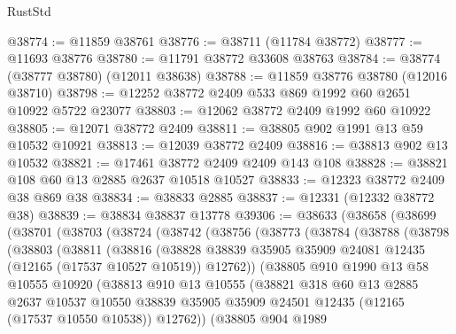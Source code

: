\begin{lexlean}{RustStd}
\begin{coremodule}
@38774 := @11859 @38761
@38776 := @38711 (@11784 @38772)
@38777 := @11693 @38776
@38780 := @11791 @38772 @33608 @38763
@38784 := @38774 (@38777 @38780) (@12011 @38638)
@38788 := @11859 @38776 @38780 (@12016 @38710)
@38798 := @12252 @38772 @2409 @533 @869 @1992 @60 @2651 @10922 @5722 @23077
@38803 := @12062 @38772 @2409 @1992 @60 @10922
@38805 := @12071 @38772 @2409
@38811 := @38805 @902 @1991 @13 @59 @10532 @10921
@38813 := @12039 @38772 @2409
@38816 := @38813 @902 @13 @10532
@38821 := @17461 @38772 @2409 @2409 @143 @108
@38828 := @38821 @108 @60 @13 @2885 @2637 @10518 @10527
@38833 := @12323 @38772 @2409 @38 @869 @38
@38834 := @38833 @2885
@38837 := @12331 (@12332 @38772 @38)
@38839 := @38834 @38837 @13778
@39306 := @38633
    (@38658
      (@38699
        (@38701
          (@38703
            (@38724
              (@38742
                (@38756
                  (@38773
                    (@38784
                      (@38788
                        (@38798
                          (@38803
                            (@38811
                              (@38816
                                (@38828
                                  @38839
                                  @35905
                                  @35909
                                  @24081
                                  @12435
                                  (@12165 (@17537 @10527 @10519))
                                  @12762))
                              (@38805
                                @910
                                @1990
                                @13
                                @58
                                @10555
                                @10920
                                (@38813
                                  @910
                                  @13
                                  @10555
                                  (@38821
                                    @318
                                    @60
                                    @13
                                    @2885
                                    @2637
                                    @10537
                                    @10550
                                    @38839
                                    @35905
                                    @35909
                                    @24501
                                    @12435
                                    (@12165 (@17537 @10550 @10538))
                                    @12762))
                                (@38805
                                  @904
                                  @1989

\end{coremodule}
\end{lexlean}
